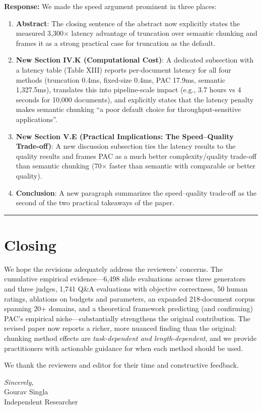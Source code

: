 \documentclass[11pt]{article}
\newcommand{\rresponse}[1]{\noindent\textcolor{response}{\textbf{Response:}} #1\medskip\medskip}
\begin{document}
\rresponse{We made the speed argument prominent in three places:
\begin{enumerate}
    \item \textbf{Abstract}: The closing sentence of the abstract now explicitly states the measured 3{,}300$\times$ latency advantage of truncation over semantic chunking and frames it as a strong practical case for truncation as the default.
    \item \textbf{New Section IV.K (Computational Cost)}: A dedicated subsection with a latency table (Table XIII) reports per-document latency for all four methods (truncation 0.4ms, fixed-size 0.4ms, PAC 17.9ms, semantic 1{,}327.5ms), translates this into pipeline-scale impact (e.g., 3.7 hours vs 4 seconds for 10{,}000 documents), and explicitly states that the latency penalty makes semantic chunking ``a poor default choice for throughput-sensitive applications''.
    \item \textbf{New Section V.E (Practical Implications: The Speed--Quality Trade-off)}: A new discussion subsection ties the latency results to the quality results and frames PAC as a much better complexity/quality trade-off than semantic chunking (70$\times$ faster than semantic with comparable or better quality).
    \item \textbf{Conclusion}: A new paragraph summarizes the speed--quality trade-off as the second of the two practical takeaways of the paper.
\end{enumerate}}

\bigskip
\hrule
\bigskip

\section*{Closing}

We hope the revisions adequately address the reviewers' concerns. The cumulative empirical evidence---6{,}498 slide evaluations across three generators and three judges, 1{,}741 Q\&A evaluations with objective correctness, 50 human ratings, ablations on budgets and parameters, an expanded 218-document corpus spanning 20+ domains, and a theoretical framework predicting (and confirming) PAC's empirical niche---substantially strengthens the original contribution. The revised paper now reports a richer, more nuanced finding than the original: chunking method effects are \textit{task-dependent and length-dependent}, and we provide practitioners with actionable guidance for when each method should be used.

We thank the reviewers and editor for their time and constructive feedback.

\bigskip
\noindent\textit{Sincerely,}\\
Gourav Singla\\
Independent Researcher
\end{document}
